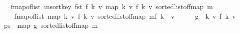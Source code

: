 \begin{isabellebody}
\ \ \ {\isachardoublequoteopen}fmap{\isacharunderscore}{\kern0pt}of{\isacharunderscore}{\kern0pt}list\ {\isacharparenleft}{\kern0pt}insort{\isacharunderscore}{\kern0pt}key\ fst\ {\isacharparenleft}{\kern0pt}f\ k{\isacharcomma}{\kern0pt}\ v{\isacharparenright}{\kern0pt}\ {\isacharparenleft}{\kern0pt}map\ {\isacharparenleft}{\kern0pt}{\isasymlambda}{\isacharparenleft}{\kern0pt}k{\isacharcomma}{\kern0pt}\ v{\isacharparenright}{\kern0pt}{\isachardot}{\kern0pt}\ {\isacharparenleft}{\kern0pt}f\ k{\isacharcomma}{\kern0pt}\ v{\isacharparenright}{\kern0pt}{\isacharparenright}{\kern0pt}\ {\isacharparenleft}{\kern0pt}sorted{\isacharunderscore}{\kern0pt}list{\isacharunderscore}{\kern0pt}of{\isacharunderscore}{\kern0pt}fmap\ m{\isacharparenright}{\kern0pt}{\isacharparenright}{\kern0pt}{\isacharparenright}{\kern0pt}\ {\isacharequal}{\kern0pt}\isanewline
\ \ \ \ {\isacharparenleft}{\kern0pt}fmap{\isacharunderscore}{\kern0pt}of{\isacharunderscore}{\kern0pt}list\ {\isacharparenleft}{\kern0pt}map\ {\isacharparenleft}{\kern0pt}{\isasymlambda}{\isacharparenleft}{\kern0pt}k{\isacharcomma}{\kern0pt}\ v{\isacharparenright}{\kern0pt}{\isachardot}{\kern0pt}\ {\isacharparenleft}{\kern0pt}f\ k{\isacharcomma}{\kern0pt}\ v{\isacharparenright}{\kern0pt}{\isacharparenright}{\kern0pt}\ {\isacharparenleft}{\kern0pt}sorted{\isacharunderscore}{\kern0pt}list{\isacharunderscore}{\kern0pt}of{\isacharunderscore}{\kern0pt}fmap\ m{\isacharparenright}{\kern0pt}{\isacharparenright}{\kern0pt}{\isacharparenright}{\kern0pt}{\isacharparenleft}{\kern0pt}f\ k\ {\isachardollar}{\kern0pt}{\isachardollar}{\kern0pt}{\isacharcolon}{\kern0pt}{\isacharequal}{\kern0pt}\ v{\isacharparenright}{\kern0pt}{\isachardoublequoteclose}\isanewline
%
\isadelimproof
%
\endisadelimproof
%
\isatagproof
{}\isamarkupfalse%
\ {\isacharminus}{\kern0pt}\isanewline
\ \ \isamarkupfalse%
\ {\isacharquery}{\kern0pt}g\ {\isacharequal}{\kern0pt}\ {\isachardoublequoteopen}{\isasymlambda}{\isacharparenleft}{\kern0pt}k{\isacharcomma}{\kern0pt}\ v{\isacharparenright}{\kern0pt}{\isachardot}{\kern0pt}\ {\isacharparenleft}{\kern0pt}f\ k{\isacharcomma}{\kern0pt}\ v{\isacharparenright}{\kern0pt}{\isachardoublequoteclose}\isanewline
\ \ \isamarkupfalse%
\ {\isacharquery}{\kern0pt}ps\ {\isacharequal}{\kern0pt}\ {\isachardoublequoteopen}map\ {\isacharquery}{\kern0pt}g\ {\isacharparenleft}{\kern0pt}sorted{\isacharunderscore}{\kern0pt}list{\isacharunderscore}{\kern0pt}of{\isacharunderscore}{\kern0pt}fmap\ m{\isacharparenright}{\kern0pt}{\isachardoublequoteclose}\isanewline
\ \ \isamarkupfalse%

\end{isabellebody}
